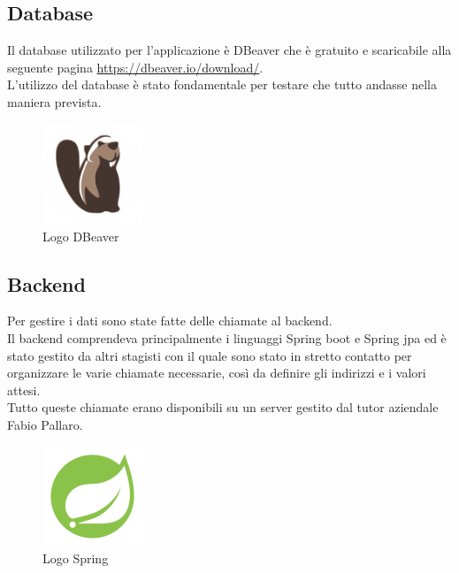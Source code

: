 \newpage

\subsection{Database}
Il database utilizzato per l'applicazione è DBeaver che è gratuito e scaricabile alla seguente pagina \url{https://dbeaver.io/download/}.\\
L'utilizzo del database è stato fondamentale per testare che tutto andasse nella maniera prevista.\\

\begin{figure}[htbp]	
	\centering
	\includegraphics[width=3cm]{immagini/logodbeaver.png}
	\caption{Logo DBeaver}
	\label{fig:Logo DBeaver}
\end{figure}

\subsection{Backend}
Per gestire i dati sono state fatte delle chiamate al backend.\\
Il backend comprendeva principalmente i linguaggi Spring boot e Spring jpa ed è stato gestito da altri stagisti con il quale sono stato in stretto contatto per organizzare le varie chiamate necessarie, così da definire gli indirizzi e i valori attesi.\\
Tutto queste chiamate erano disponibili su un server gestito dal tutor aziendale Fabio Pallaro.\\

\begin{figure}[htbp]	
	\centering
	\includegraphics[width=3cm]{immagini/springlogo.png}
	\caption{Logo Spring}
	\label{fig:Logo Spring}
\end{figure}

\newpage

